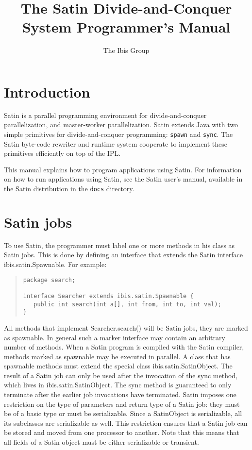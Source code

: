 \documentclass[10pt]{article}
\begin{document}
\title{The Satin Divide-and-Conquer System Programmer's Manual}

\author{The Ibis Group}

\maketitle

\section{Introduction}

Satin is a parallel programming environment for divide-and-conquer
parallelization, and master-worker parallelization. Satin extends Java
with two simple primitives for divide-and-conquer programming: \texttt{spawn}
and \texttt{sync}. The Satin byte-code rewriter and runtime system cooperate to
implement these primitives efficiently on top of the IPL.  

This manual explains how to program applications using Satin.
For information on how to run applications using Satin, see the Satin
user's manual, available in the Satin distribution in the
\texttt{docs} directory.

\section{Satin jobs}

To use Satin, the programmer must label one or more methods in his
class as Satin jobs. This is done by defining an interface that
extends the Satin interface ibis.satin.Spawnable. For example:

{\small
\begin{quote}
\begin{verbatim}
package search;

interface Searcher extends ibis.satin.Spawnable {
   public int search(int a[], int from, int to, int val);
}
\end{verbatim}
\end{quote}
}
\noindent

All methods that implement Searcher.search() will be Satin jobs, they
are marked as spawnable.  In general such a marker interface may
contain an arbitrary number of methods.  When a Satin program is
compiled with the Satin compiler, methods marked as spawnable may be
executed in parallel. A class that has spawnable methods 
must extend the special class ibis.satin.SatinObject.
The result of a Satin job can only be
used after the invocation of the sync method, which lives in
ibis.satin.SatinObject. The sync method is guaranteed to only
terminate after the earlier job invocations have terminated.  Satin
imposes one restriction on the type of parameters and return type of a
Satin job: they must be of a basic type or must be serializable.
Since a SatinObject is serializable, all its subclasses are
serializable as well. This restriction ensures that a Satin job can be
stored and moved from one processor to another. Note that this means that
all fields of a Satin object must be either serializable or transient.
\end{document}

